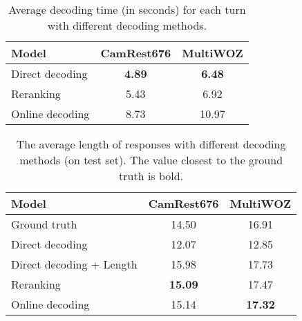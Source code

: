 \documentclass[11pt,a4paper]{article}
\begin{document}
\begin{table}[t]
    \centering
    \footnotesize
    \renewcommand{\arraystretch}{0.9}
    \begin{tabular}{lcc}
        \toprule
        \textbf{Model}  & \textbf{CamRest676} & \textbf{MultiWOZ} \\ \midrule
        Direct decoding & \textbf{4.89} & \textbf{6.48} \\
        Reranking & 5.43 & 6.92 \\
        Online decoding & 8.73 &  10.97 \\
    \bottomrule
    \end{tabular}
    \vspace{-0.5em}
    \caption{Average decoding time (in seconds) for each turn with different decoding methods. \label{tab:runtime_analysis}}
    \vspace{-0.5em}
\end{table}

\begin{table}[t]
    \centering
    \footnotesize
    \renewcommand{\arraystretch}{0.9}
    \begin{tabular}{lcc}
        \toprule
        \textbf{Model}  & \textbf{CamRest676} & \textbf{MultiWOZ} \\ \midrule
        Ground truth & 14.50 & 16.91\\
        Direct decoding & 12.07 & 12.85\\
        Direct decoding + Length & 15.98 & 17.73\\
        Reranking & \textbf{15.09} & 17.47\\
        Online decoding & 15.14 & \textbf{17.32}\\
    \bottomrule
    \end{tabular}
    \vspace{-0.5em}
    \caption{The average length of responses with different decoding methods (on test set). The value closest to the ground truth is bold. \label{tab:avg_len}}
    \vspace{-1em}
\end{table}
\end{document}
